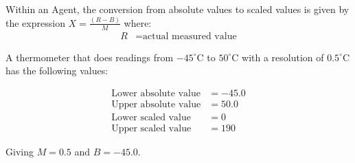 Within an Agent, the conversion from absolute values to scaled values is given by the expression $X = \frac{(R - B)}{M}$ where:
\begin{align*}
    R &= \text{actual measured value}
\end{align*}

A thermometer that does readings from $-45^\circ$C  to $50^\circ$C with a resolution of $0.5^\circ$C has the following values:

\begin{align*}
    \text{Lower absolute value} &= -45.0 \\
    \text{Upper absolute value} &= 50.0 \\
    \text{Lower scaled value} &= 0 \\
    \text{Upper scaled value} &= 190
\end{align*}

Giving $M = 0.5$ and $B = -45.0$.
